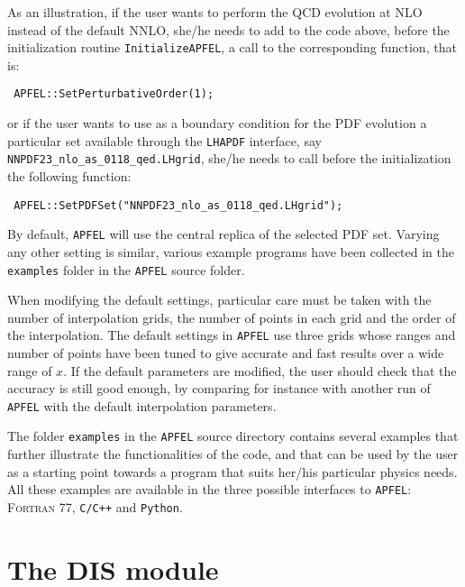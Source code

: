 \documentclass[11pt,a4paper]{article}
\begin{document}
As an illustration, if the user wants to perform the QCD evolution at NLO
instead of  the default NNLO, she/he needs to add to the code above,
before the initialization routine {\tt InitializeAPFEL}, a call to the
corresponding function, that is:
\begin{lstlisting}
 APFEL::SetPerturbativeOrder(1);
\end{lstlisting}
or if the user wants to use as a boundary condition for the PDF
evolution a particular set available through the {\tt LHAPDF} interface, say
{\tt NNPDF23\_nlo\_as\_0118\_qed.LHgrid}, she/he needs
to call before the initialization the following function:
\begin{lstlisting}
 APFEL::SetPDFSet("NNPDF23_nlo_as_0118_qed.LHgrid");
\end{lstlisting}
By default, {\tt APFEL} will use the central replica of
the selected PDF set. 
%
Varying any other setting is similar, various example programs
have been collected in the {\tt examples} folder in the {\tt APFEL} source
folder.
%

When modifying the default settings, particular care 
must be taken with the number of interpolation grids, the number
of points in each grid and the order of the interpolation.
%
The  default
settings in {\tt APFEL} use three grids whose ranges and
number of points have been tuned to give accurate and
fast results over a wide range of $x$.
%
If the default parameters are modified, the user should check
that the accuracy is still good enough, by comparing for instance
with another run of {\tt APFEL} with the default interpolation
parameters.

The folder {\tt examples} in the {\tt APFEL} source directory contains
several examples that further illustrate the functionalities of
the code, and that can be used by the user as a starting point
towards a program that suits her/his particular physics needs.
%
All these examples are available in the three possible interfaces to
{\tt APFEL}: {\scshape Fortran 77}, {\tt C/C++} and {\tt Python}.


\section{The DIS module}

\clearpage


\end{document}
